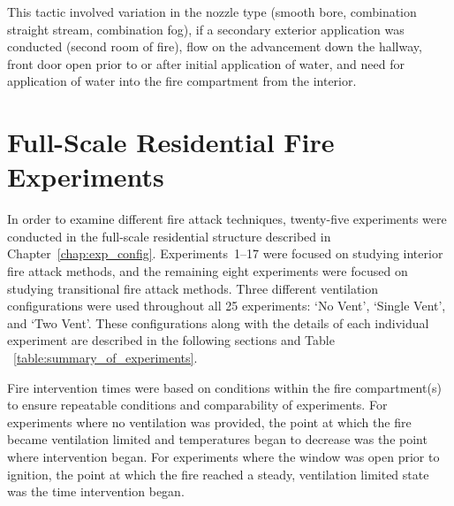 \documentclass[12pt,oneside]{book}
\begin{document}
This tactic involved variation in the nozzle type (smooth bore, combination straight stream, combination fog), if a secondary exterior application was conducted (second room of fire), flow on the advancement down the hallway, front door open prior to or after initial application of water, and need for application of water into the fire compartment from the interior. 

\chapter{Full-Scale Residential Fire Experiments}

In order to examine different fire attack techniques, twenty-five experiments were conducted in the full-scale residential structure described in Chapter~\ref{chap:exp_config}. Experiments~1--17 were focused on studying interior fire attack methods, and the remaining eight experiments were focused on studying transitional fire attack methods. Three different ventilation configurations were used throughout all 25 experiments: `No Vent', `Single Vent', and `Two Vent'. These configurations along with the details of each individual experiment are described in the following sections and Table ~\ref{table:summary_of_experiments}.  

Fire intervention times were based on conditions within the fire compartment(s) to ensure repeatable conditions and comparability of experiments. For experiments where no ventilation was provided, the point at which the fire became ventilation limited and temperatures began to decrease was the point where intervention began. For experiments where the window was open prior to ignition, the point at which the fire reached a steady, ventilation limited state was the time intervention began.

\clearpage
\end{document}
